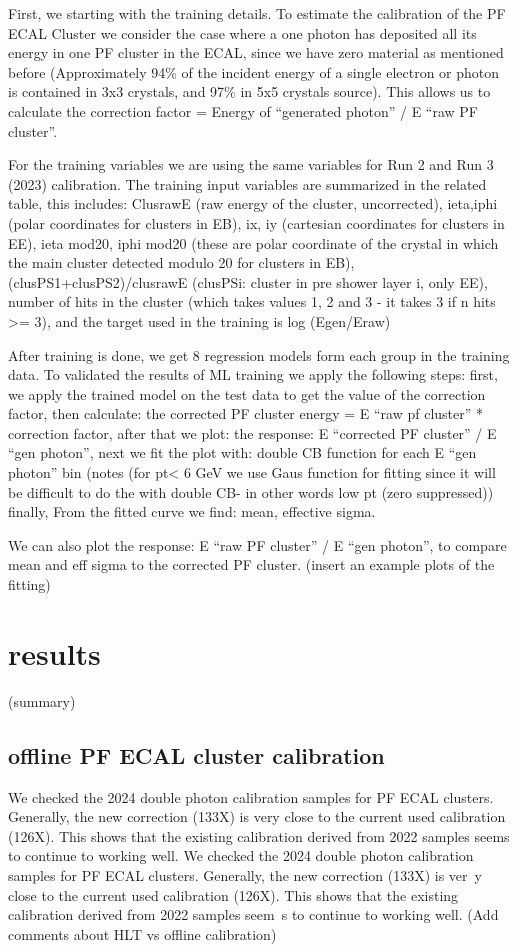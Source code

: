 First, we starting with the training details. To estimate the calibration of the PF ECAL Cluster we consider the case where a one photon has deposited all its energy in one PF cluster in the ECAL, since we have zero material as mentioned before (Approximately 94\% of the incident energy of a single electron or photon is contained in 3x3 crystals, and 97\% in 5x5 crystals source).  
This allows us to calculate the correction factor = Energy of “generated photon” / E “raw PF cluster”.

For the training variables we are using the same variables for Run 2 and Run 3 (2023) calibration. The training input variables are summarized in the related table, this includes:  
ClusrawE (raw energy of the cluster, uncorrected), 
ieta,iphi (polar coordinates for clusters in EB), 
ix, iy (cartesian coordinates for clusters in EE), 
ieta mod20, iphi mod20 (these are polar coordinate of the crystal in which the main cluster detected modulo 20 for clusters in EB), 
(clusPS1+clusPS2)/clusrawE (clusPSi: cluster in pre shower layer i, only EE), 
 number of hits in the cluster (which takes values 1, 2 and 3 - it takes 3 if n hits >= 3), 
and the target used in the training is log (Egen/Eraw)  

After training is done, we get 8 regression models form each group in the training data. To validated the results of ML training we apply the following steps: 
first, we apply the trained model on the test data to get the value of the correction factor, 
then calculate:  the corrected PF cluster energy = E “raw pf cluster” * correction factor, 
after that we plot: the response: E “corrected PF cluster” / E “gen photon”, 
next we fit the plot with: double CB function for each E “gen photon” bin (notes (for pt< 6 GeV we use Gaus function for fitting since it will be difficult to do the with double CB- in other words low pt (zero suppressed)) 
finally, From the fitted curve we find: mean, effective sigma.  

We can also plot the response: E “raw PF cluster” / E “gen photon”, to compare mean and eff sigma to the corrected PF cluster. (insert an example plots of the fitting)   
\section{results}
(summary)

\subsection{offline PF ECAL cluster calibration}
We checked the 2024 double photon calibration samples for PF ECAL clusters. Generally, the new correction (133X) is very close to the current used calibration (126X).
This shows that the existing calibration derived from 2022 samples seems to continue to working well.
We checked the 2024 double photon calibration samples for PF ECAL clusters. Generally, the new correction (133X) is ver\
y close to the current used calibration (126X). This shows that the existing calibration derived from 2022 samples seem\
s to continue to working well. (Add comments about HLT vs offline calibration)

